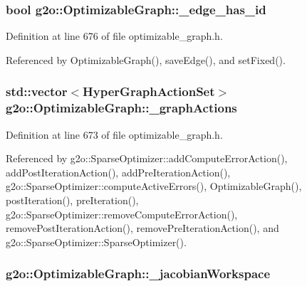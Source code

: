 \subsubsection[{\texorpdfstring{\+\_\+edge\+\_\+has\+\_\+id}{_edge_has_id}}]{\setlength{\rightskip}{0pt plus 5cm}bool g2o\+::\+Optimizable\+Graph\+::\+\_\+edge\+\_\+has\+\_\+id\hspace{0.3cm}{\ttfamily [protected]}}\hypertarget{structg2o_1_1OptimizableGraph_a260451b25094e5e929cc2841e31242f4}{}\label{structg2o_1_1OptimizableGraph_a260451b25094e5e929cc2841e31242f4}


Definition at line 676 of file optimizable\+\_\+graph.\+h.



Referenced by Optimizable\+Graph(), save\+Edge(), and set\+Fixed().

\subsubsection[{\texorpdfstring{\+\_\+graph\+Actions}{_graphActions}}]{\setlength{\rightskip}{0pt plus 5cm}std\+::vector$<${\bf Hyper\+Graph\+Action\+Set}$>$ g2o\+::\+Optimizable\+Graph\+::\+\_\+graph\+Actions\hspace{0.3cm}{\ttfamily [protected]}}\hypertarget{structg2o_1_1OptimizableGraph_a5e6a371ad7709692e52886ecf3e7250c}{}\label{structg2o_1_1OptimizableGraph_a5e6a371ad7709692e52886ecf3e7250c}


Definition at line 673 of file optimizable\+\_\+graph.\+h.



Referenced by g2o\+::\+Sparse\+Optimizer\+::add\+Compute\+Error\+Action(), add\+Post\+Iteration\+Action(), add\+Pre\+Iteration\+Action(), g2o\+::\+Sparse\+Optimizer\+::compute\+Active\+Errors(), Optimizable\+Graph(), post\+Iteration(), pre\+Iteration(), g2o\+::\+Sparse\+Optimizer\+::remove\+Compute\+Error\+Action(), remove\+Post\+Iteration\+Action(), remove\+Pre\+Iteration\+Action(), and g2o\+::\+Sparse\+Optimizer\+::\+Sparse\+Optimizer().

\subsubsection[{\texorpdfstring{\+\_\+jacobian\+Workspace}{_jacobianWorkspace}}]{ g2o\+::\+Optimizable\+Graph\+::\+\_\+jacobian\+Workspace\hspace{0.3cm}{\ttfamily [protected]}}\hypertarget{structg2o_1_1OptimizableGraph_a161c01a29d09cca22e223ab2048eaba8}{}\label{structg2o_1_1OptimizableGraph_a161c01a29d09cca22e223ab2048eaba8}


